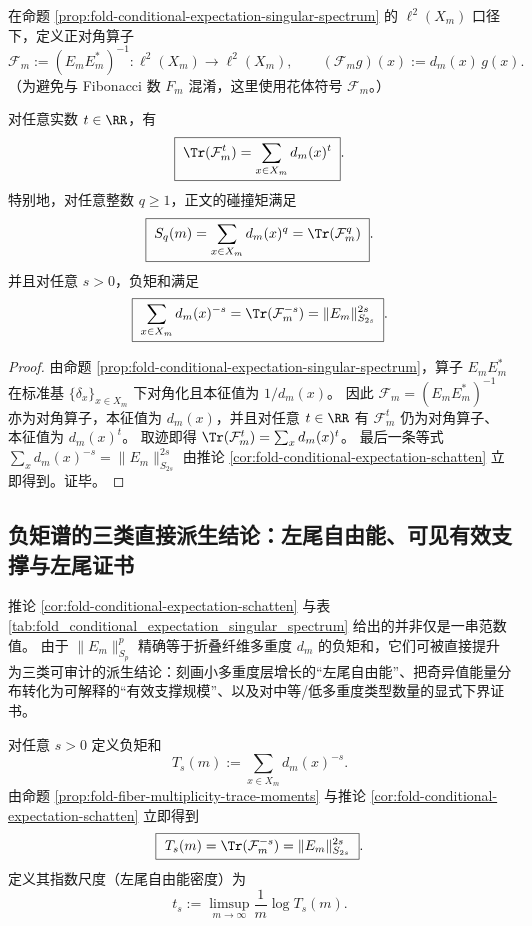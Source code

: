 \begin{definition}\label{def:fold-fiber-multiplicity-operator}
在命题 \ref{prop:fold-conditional-expectation-singular-spectrum} 的 \(\ell^2(X_m)\) 口径下，定义正对角算子
\[
\mathcal{F}_m:=(E_mE_m^\ast)^{-1}:\ell^2(X_m)\to\ell^2(X_m),
\qquad
(\mathcal{F}_m g)(x):=d_m(x)\,g(x).
\]
（为避免与 Fibonacci 数 \(F_m\) 混淆，这里使用花体符号 \(\mathcal{F}_m\)。）
\end{definition}

\begin{proposition}[空间矩与负矩的迹表示]\label{prop:fold-fiber-multiplicity-trace-moments}
对任意实数 \(t\in\RR\)，有
\[
\boxed{\;
\Tr(\mathcal{F}_m^{t})=\sum_{x\in X_m} d_m(x)^{t}\; }.
\]
特别地，对任意整数 \(q\ge 1\)，正文的碰撞矩满足
\[
\boxed{\;
S_q(m)=\sum_{x\in X_m}d_m(x)^q=\Tr(\mathcal{F}_m^{q})\; }.
\]
并且对任意 \(s>0\)，负矩和满足
\[
\boxed{\;
\sum_{x\in X_m}d_m(x)^{-s}=\Tr(\mathcal{F}_m^{-s})=\|E_m\|_{S_{2s}}^{2s}\; }.
\]
\end{proposition}
\begin{proof}
由命题 \ref{prop:fold-conditional-expectation-singular-spectrum}，算子 \(E_mE_m^\ast\) 在标准基 \(\{\delta_x\}_{x\in X_m}\) 下对角化且本征值为 \(1/d_m(x)\)。
因此 \(\mathcal{F}_m=(E_mE_m^\ast)^{-1}\) 亦为对角算子，本征值为 \(d_m(x)\)，并且对任意 \(t\in\RR\) 有 \(\mathcal{F}_m^t\) 仍为对角算子、本征值为 \(d_m(x)^t\)。
取迹即得 \(\Tr(\mathcal{F}_m^{t})=\sum_x d_m(x)^t\)。
最后一条等式 \(\sum_x d_m(x)^{-s}=\|E_m\|_{S_{2s}}^{2s}\) 由推论 \ref{cor:fold-conditional-expectation-schatten} 立即得到。证毕。
\end{proof}

\subsection{负矩谱的三类直接派生结论：左尾自由能、可见有效支撑与左尾证书}\label{app:op-algebra-negative-moment-consequences}

推论 \ref{cor:fold-conditional-expectation-schatten} 与表 \ref{tab:fold_conditional_expectation_singular_spectrum} 给出的并非仅是一串范数值。
由于 \(\|E_m\|_{S_p}^p\) 精确等于折叠纤维多重度 \(d_m\) 的负矩和，它们可被直接提升为三类可审计的派生结论：刻画小多重度层增长的“左尾自由能”、把奇异值能量分布转化为可解释的“有效支撑规模”、以及对中等/低多重度类型数量的显式下界证书。

\begin{definition}[负矩和与左尾自由能密度]\label{def:fold-negative-moment-sum-left-tail}
对任意 \(s>0\) 定义负矩和
\[
T_s(m):=\sum_{x\in X_m} d_m(x)^{-s}.
\]
由命题 \ref{prop:fold-fiber-multiplicity-trace-moments} 与推论 \ref{cor:fold-conditional-expectation-schatten} 立即得到
\[
\boxed{\ T_s(m)=\Tr(\mathcal{F}_m^{-s})=\|E_m\|_{S_{2s}}^{2s}\ }.
\]
定义其指数尺度（左尾自由能密度）为
\[
t_s:=\limsup_{m\to\infty}\frac{1}{m}\log T_s(m).
\]
\end{definition}

